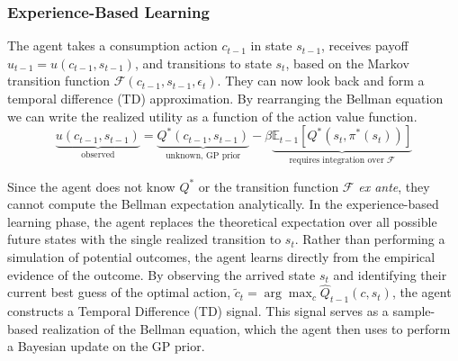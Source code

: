 \subsubsection{Experience-Based Learning}

The agent takes a consumption action $c_{t-1}$ in state $s_{t-1}$, receives
payoff $u_{t-1} = u(c_{t-1}, s_{t-1})$, and transitions to state $s_t$, based on
the Markov transition function $\mathcal{F}(c_{t-1}, s_{t-1}, \epsilon_t)$. They can
now look back and form a temporal difference (TD) approximation. By rearranging the
Bellman equation we can write the realized utility as a function of the action value function.
\begin{equation}
\underbrace{u(c_{t-1}, s_{t-1})}_{\text{observed}} = \underbrace{Q^*(c_{t-1}, s_{t-1})}_{\text{unknown, GP prior}} - \beta \underbrace{\mathbb{E}_{t-1}[Q^*(s_t, \pi^*(s_t))]}_{\text{requires integration over } \mathcal{F}}
\end{equation}

Since the agent does not know $Q^*$ or the transition function $\mathcal{F}$ 
\textit{ex ante}, they cannot compute the Bellman expectation analytically. In the 
experience-based learning phase, the agent replaces the theoretical expectation over 
all possible future states with the single realized transition to $s_t$. Rather than 
performing a simulation of potential outcomes, the agent learns directly from the 
empirical evidence of the outcome. By observing the arrived state $s_t$ and identifying 
their current best guess of the optimal action, $\tilde{c}_t = \arg\max_{c} \hat{Q}_{t-1}(c, s_t)$, 
the agent constructs a Temporal Difference (TD) signal. This signal serves as a 
sample-based realization of the Bellman equation, which the agent then uses to 
perform a Bayesian update on the GP prior.

